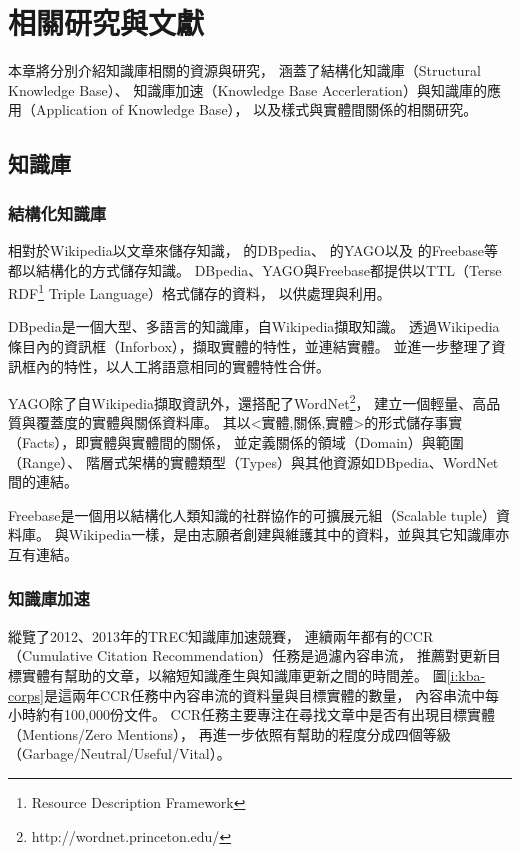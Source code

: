 %
%
%
\chapter{相關研究與文獻}
\label{c:related}

本章將分別介紹知識庫相關的資源與研究，
涵蓋了結構化知識庫（Structural Knowledge Base）、
知識庫加速（Knowledge Base Accerleration）與知識庫的應用（Application of Knowledge Base），
以及樣式與實體間關係的相關研究。

\section{知識庫}
\subsection{結構化知識庫}
相對於Wikipedia以文章來儲存知識，\cite{dbpedia} 的DBpedia、
\cite{yago} 的YAGO以及\cite{freebase} 的Freebase等都以結構化的方式儲存知識。
DBpedia、YAGO與Freebase都提供以TTL（Terse RDF\footnote{Resource Description Framework} Triple Language）格式儲存的資料，
以供處理與利用。

DBpedia是一個大型、多語言的知識庫，自Wikipedia擷取知識。
透過Wikipedia條目內的資訊框（Inforbox），擷取實體的特性，並連結實體。
並進一步整理了資訊框內的特性，以人工將語意相同的實體特性合併。

YAGO除了自Wikipedia擷取資訊外，還搭配了WordNet\footnote{http://wordnet.princeton.edu/}，
建立一個輕量、高品質與覆蓋度的實體與關係資料庫。
其以<實體,關係,實體>的形式儲存事實（Facts），即實體與實體間的關係，
並定義關係的領域（Domain）與範圍（Range）、
階層式架構的實體類型（Types）與其他資源如DBpedia、WordNet間的連結。

Freebase是一個用以結構化人類知識的社群協作的可擴展元組（Scalable tuple）資料庫。
與Wikipedia一樣，是由志願者創建與維護其中的資料，並與其它知識庫亦互有連結。

\subsection{知識庫加速}

\cite{kba2012,kba2013}縱覽了2012、2013年的TREC知識庫加速競賽，
連續兩年都有的CCR（Cumulative Citation Recommendation）任務是過濾內容串流，
推薦對更新目標實體有幫助的文章，以縮短知識產生與知識庫更新之間的時間差。
圖\ref{i:kba-corps}是這兩年CCR任務中內容串流的資料量與目標實體的數量，
內容串流中每小時約有100,000份文件。
CCR任務主要專注在尋找文章中是否有出現目標實體（Mentions/Zero Mentions），
再進一步依照有幫助的程度分成四個等級（Garbage/Neutral/Useful/Vital）。

